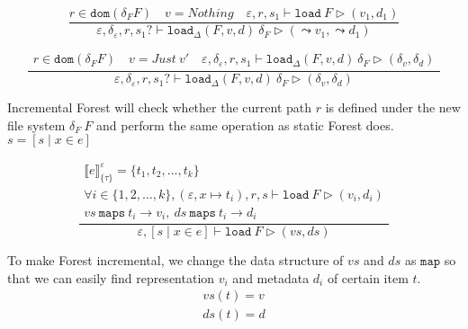 \documentclass[10pt,twoside,a4paper]{article}
\theoremstyle{theorem}
\theoremstyle{lemma}
\theoremstyle{property}
\theoremstyle{definition}
\theoremstyle{assumption}
\begin{document}
\begin{displaymath}
	\frac{
		r \in \mathtt{dom}(\delta_F F) \quad v = Nothing \quad
		\varepsilon, r, s_1 \vdash \mathtt{load}~F \rhd (v_1, d_1)
	}
	{\varepsilon, \delta_\varepsilon, r, s_1? \vdash \mathtt{load}_\Delta (F,v,d)~ \delta_F \rhd (\leadsto v_1, \leadsto d_1)}
\end{displaymath}

\begin{displaymath}
	\frac{\begin{array}{c}
		r \in \mathtt{dom}(\delta_F F) \quad v = Just~v' \quad
		\varepsilon, \delta_\varepsilon, r, s_1 \vdash \mathtt{load}_\Delta (F,v,d)~ \delta_F \rhd (\delta_v,\delta_d)
	\end{array}}
	{\varepsilon, \delta_\varepsilon, r, s_1? \vdash \mathtt{load}_\Delta (F,v,d)~ \delta_F \rhd (\delta_v,\delta_d)}
\end{displaymath}

Incremental Forest will check whether the current path $r$ is defined under the new file system $\delta_F~F$ and perform the same operation as static Forest does.\\

$\boxed{s = [ s \mid x \in e]}$

\begin{displaymath}
	\frac{\begin{array}{c}
		\llbracket e \rrbracket^{\varepsilon}_{\{\tau\}} = \{t_1,t_2,\dots,t_k\}\\
		\forall i \in \{1,2,\dots,k\}, (\varepsilon, x \mapsto t_i), r, s\vdash \mathtt{load}~F \rhd (v_i, d_i)\\
		vs ~\mathtt{maps} ~t_i \to v_i, ~ds ~\mathtt{maps} ~t_i \to d_i
	\end{array}}
	{\varepsilon, [ s \mid x \in e] \vdash \mathtt{load}~F \rhd (vs,ds) }
\end{displaymath}

To make Forest incremental, %
we change the data structure of $vs$ and $ds$ as $\mathtt{map}$ so that we can easily find representation $v_i$ and metadata $d_i$ of certain item $t$. 
\begin{eqnarray*}
	vs(t) = v \\
	ds(t) = d 
\end{eqnarray*}
\end{document}
